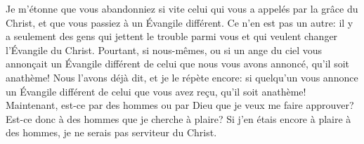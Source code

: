 Je m’étonne que vous abandonniez si vite celui qui vous a appelés par la grâce du Christ,
	et que vous passiez à un Évangile différent.
Ce n'en est pas un autre:
	il y a seulement des gens qui jettent le trouble parmi vous
	et qui veulent changer l’Évangile du Christ.
Pourtant, si nous-mêmes, ou si un ange du ciel
		vous annonçait un Évangile différent de celui que nous vous avons annoncé,
	qu’il soit anathème!
Nous l’avons déjà dit, et je le répète encore:
	si quelqu’un vous annonce un Évangile différent de celui que vous avez reçu,
	qu’il soit anathème!
Maintenant, est-ce par des hommes ou par Dieu que je veux me faire approuver?
Est-ce donc à des hommes que je cherche à plaire?
Si j’en étais encore à plaire à des hommes, je ne serais pas serviteur du Christ.
